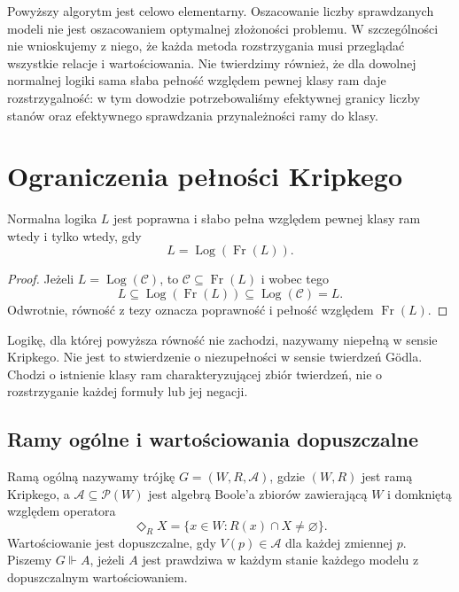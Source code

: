 \begin{uwaga}
\label{rem:ncl-kripke-decision-complexity}
Powyższy algorytm jest celowo elementarny.
Oszacowanie liczby sprawdzanych modeli
nie jest oszacowaniem optymalnej złożoności
problemu. W szczególności nie wnioskujemy
z niego, że każda metoda rozstrzygania
musi przeglądać wszystkie relacje i wartościowania.
Nie twierdzimy również, że dla dowolnej
normalnej logiki sama słaba pełność
względem pewnej klasy ram daje rozstrzygalność:
w tym dowodzie potrzebowaliśmy efektywnej
granicy liczby stanów oraz efektywnego
sprawdzania przynależności ramy do klasy.
\end{uwaga}

\section{Ograniczenia pełności Kripkego}

\begin{stwierdzenie}
\label{prop:ncl-kripke-completeness-criterion}
Normalna logika $L$ jest poprawna i słabo pełna
względem pewnej klasy ram wtedy i tylko wtedy, gdy
\[
 L=\operatorname{Log}(\operatorname{Fr}(L)).
\]
\end{stwierdzenie}
\begin{proof}
Jeżeli $L=\operatorname{Log}(\mathcal C)$,
to $\mathcal C\subseteq\operatorname{Fr}(L)$
i wobec tego
\[
 L\subseteq\operatorname{Log}(\operatorname{Fr}(L))
 \subseteq\operatorname{Log}(\mathcal C)=L.
\]
Odwrotnie, równość z tezy oznacza poprawność
i pełność względem $\operatorname{Fr}(L)$.
\end{proof}
Logikę, dla której powyższa równość nie zachodzi,
nazywamy niepełną w sensie Kripkego.
Nie jest to stwierdzenie o niezupełności
w sensie twierdzeń Gödla. Chodzi o istnienie
klasy ram charakteryzującej zbiór twierdzeń,
nie o rozstrzyganie każdej formuły lub jej negacji.

\subsection{Ramy ogólne i wartościowania dopuszczalne}

\begin{definicja}
\label{def:ncl-kripke-general-frame}
Ramą ogólną nazywamy trójkę $G=(W,R,\mathcal A)$,
gdzie $(W,R)$ jest ramą Kripkego,
a $\mathcal A\subseteq\mathcal P(W)$ jest
algebrą Boole'a zbiorów zawierającą $W$
i domkniętą względem operatora
\[
 \Diamond_R X=\{x\in W:R(x)\cap X\ne\varnothing\}.
\]
Wartościowanie jest dopuszczalne, gdy
$V(p)\in\mathcal A$ dla każdej zmiennej $p$.
Piszemy $G\Vdash A$, jeżeli $A$ jest prawdziwa
w każdym stanie każdego modelu z dopuszczalnym
wartościowaniem.
\end{definicja}


